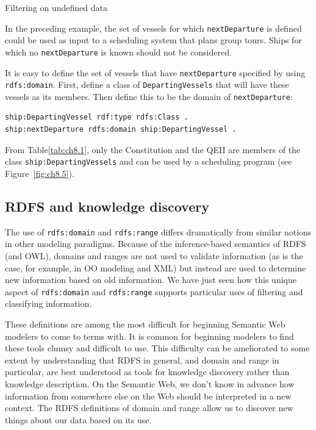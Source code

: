 \begin{challenge}{Filtering on undefined data}
\label{chal:12}

In the preceding example, the set of vessels for which \texttt{nextDeparture} is
defined could be used as input to a scheduling system that plans group
tours. Ships for which no \texttt{nextDeparture} is known should not be
considered.

\solution

It is easy to define the set of vessels that have \texttt{nextDeparture}
specified by using \texttt{rdfs:domain}. First, define a class of
\texttt{DepartingVessels} that will have these vessels as its members. Then
define this to be the domain of \texttt{nextDeparture}:

\begin{lstlisting}
ship:DepartingVessel rdf:type rdfs:Class .
ship:nextDeparture rdfs:domain ship:DepartingVessel .
\end{lstlisting}

From Table\ref{tab:ch8.1}, only the Constitution and the QEII are members of the
class 
\texttt{ship:DepartingVessels} and can be used by a scheduling program (see
Figure~\ref{fig:ch8.5}).
\end{challenge}

\subsection{RDFS and knowledge discovery}

The use of \texttt{rdfs:domain} and \texttt{rdfs:range} differs dramatically from similar
notions in other modeling paradigms. Because of the inference-based
semantics of RDFS (and OWL), domains and ranges are not used to validate
information (as is the case, for example, in OO modeling and XML) but
instead are used to determine new information based on old information.
We have just seen how this unique aspect of \texttt{rdfs:domain} and \texttt{rdfs:range}
supports particular uses of filtering and classifying information.

These definitions are among the most difficult for beginning Semantic
Web modelers to come to terms with. It is common for beginning modelers
to find these tools clumsy and difficult to use. This difficulty can be
ameliorated to some extent by understanding that RDFS in general, and
domain and range in particular, are best understood as tools for
knowledge discovery rather than knowledge description. On the Semantic
Web, we don't know in advance how information from somewhere else
on the Web should be interpreted in a new context. The RDFS definitions
of domain and range
allow us to discover new things about our data based on its use.


